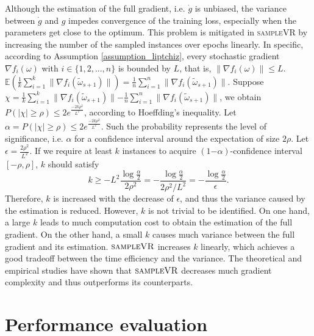 \documentclass[letterpaper]{article}
\begin{document}
 Although the estimation of the full gradient, i.e. $\dot{g}$ is unbiased, the variance between $\dot{g}$ and $g$ impedes convergence of the training loss, especially when the parameters get close to the optimum. This problem is mitigated in \textsc{sampleVR} by increasing the number of the sampled instances  over epochs linearly.     In specific, according to Assumption \ref{assumption_liptchiz}, every stochastic gradient $\nabla f_i(\omega)$ with $i\in\{1,2, ..., n\}$ is bounded by $L$, that is, $\parallel  \nabla f_i(\omega)  \parallel \le L$.  $\mathbb{E}\left(\frac{1}{k}\sum\limits_{i=1}^k\parallel  \nabla f_i(\tilde{\omega}_{s+1})  \parallel\right) \mathrm{=} \frac{1}{n}\sum\limits_{i=1}^n\parallel \nabla f_i(\tilde{\omega}_{s+1})\parallel$. Suppose $\chi  \mathrm{=} \frac{1}{k}\sum\limits_{i=1}^k\parallel \nabla f_i(\tilde{\omega}_{s+1})  \parallel - \frac{1}{n}\sum\limits_{i=1}^n\parallel \nabla f_i(\tilde{\omega}_{s+1})\parallel$, we obtain $P( | \chi | \ge \rho)  \mathrm{\le} 2e^{\frac{-2k\rho^2}{L^2}}$, according to Hoeffding's inequality. Let $\alpha \mathrm{=} P(| \chi | \ge \rho) \le 2e^{\frac{-2k\rho^2}{L^2}}$. Such the probability represents the level of significance, i.e. $\alpha$   for a confidence interval  around the expectation of size $2\rho$. Let $\epsilon = \frac{2\rho^2}{L^2}$. If we require at least $k$ instances  to acquire $(1\mathrm{-}\alpha)$-confidence interval $[-\rho, \rho]$,  $k$ should satisfy
\begin{equation}
\label{equ_estimate_samples_lower_bound}
k\ge - L^2\frac{\log \frac{\alpha}{2}}{2\rho^2} = - \frac{\log \frac{\alpha}{2}}{2\rho^2/L^2} = - \frac{\log \frac{\alpha}{2}}{\epsilon}.
\end{equation}  Therefore, $k$ is increased with the decrease of $\epsilon$, and thus the variance caused by the estimation  is reduced.  However, $k$ is not trivial to be identified. On one hand, a large $k$ leads to much computation cost to obtain the estimation of the full gradient.   On the other hand, a small $k$ causes much variance between  the full gradient and its estimation.  $\textsc{sampleVR}$ increases $k$ linearly, which achieves a good tradeoff between the time efficiency and the variance. The theoretical and empirical studies have shown that $\textsc{sampleVR}$ decreases much gradient complexity and  thus outperforms its counterparts.


\section{Performance evaluation}
\label{sect_performance_evaluation}
\end{document}
